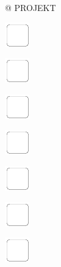 \documentclass[11pt,titlepage]{article}
\begin{document}
\small %
\noindent \hspace{-4mm} @ \hfill PROJEKT

\vspace{6mm}

\noindent
\includegraphics[]{checkbox-6mm.pdf}

\vspace{12mm}

\noindent
\includegraphics[]{checkbox-6mm.pdf}

\vspace{12mm}

\noindent
\includegraphics[]{checkbox-6mm.pdf}

\vspace{12mm}

\noindent
\includegraphics[]{checkbox-6mm.pdf}

\vspace{12mm}

\noindent
\includegraphics[]{checkbox-6mm.pdf}

\vspace{12mm}

\noindent
\includegraphics[]{checkbox-6mm.pdf}

\vspace{12mm}

\noindent
\includegraphics[]{checkbox-6mm.pdf}
\end{document}
